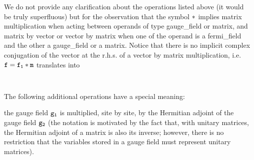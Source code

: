 

\vskip 3mm



\vskip 3mm



\vskip 3mm



\vskip 2mm

We do not  provide any clarification about the operations
listed above (it would be truly superfluous)
but for the observation that the symbol $\tt *$ implies matrix multiplication
when acting between operands of type gauge\_field or matrix,
and matrix by vector or vector by matrix when one of the operand is 
a fermi\_field and the other a gauge\_field or a matrix. Notice that there
is no implicit complex conjugation of the vector at the r.h.s. of a
vector by matrix multiplication, i.e. $\tt f=f_1 * m$ translates into

\vskip 4mm
{\baselineskip 5mm \tt
{} 
}

The following additional operations have a special meaning:


{\parindent=0pt
the gauge field $\tt g_1$ is multiplied, site by site, by the Hermitian
adjoint of the gauge field $\tt g_2$ (the notation is motivated by the fact
that, with unitary matrices, the Hermitian adjoint of a matrix is also
its inverse; however, there is no restriction that the variables stored
in a gauge field must represent unitary matrices).}
                                                                

